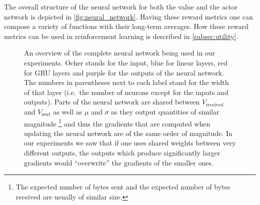 \documentclass[10pt,sigconf,anonymous]{acmart}
\begin{document}

The overall structure of the neural network for both the value and the actor network is depicted in \autoref{fig:neural_network}. Having these reward metrics one can compose a variety of functions with their long-term averages. How these reward metrics can be used in reinforcement learning is described in \autoref{subsec:utility}. 

\begin{figure}
\begin{minipage}{\columnwidth}



\caption{An overview of the complete neural network being used in our experiments. Ocher stands for the input, blue for linear layers, red for GRU layers and purple for the outputs of the neural network. The numbers in parentheses next to each label stand for the width of that layer (i.e.~the number of neurons except for the inputs and outputs). Parts of the neural network are shared between $V_\text{received}$ and $V_\text{sent}$ as well as $\mu$ and $\sigma$ as they output quantities of similar magnitude \protect\footnote{The expected number of bytes sent and the expected number of bytes received are usually of similar size.} and thus the gradients that are computed when updating the neural network are of the same order of magnitude. In our experiments we saw that if one uses shared weights between very different outputs, the outputs which produce significantly larger gradients would ``overwrite'' the gradients of the smaller ones.}
\label{fig:neural_network}
\end{minipage}
\end{figure}
\end{document}
